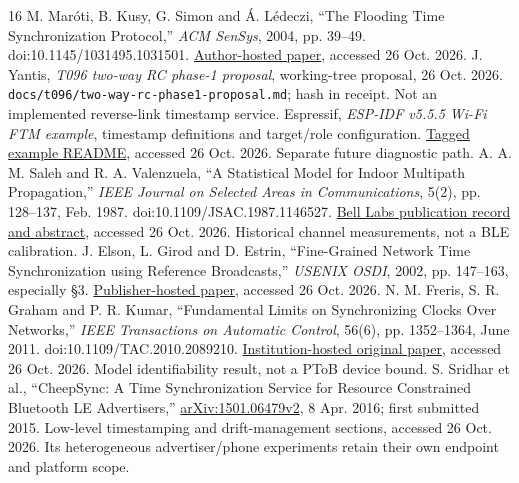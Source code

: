 \documentclass[11pt,letterpaper]{article}
\newcommand{\src}[1]{\nolinkurl{#1}}
\begin{document}
\begin{thebibliography}{16}
 M. Mar\'oti, B. Kusy, G. Simon and \'A. L\'edeczi, ``The Flooding Time Synchronization Protocol,'' \textit{ACM SenSys}, 2004, pp. 39--49. doi:10.1145/1031495.1031501. \href{https://www.isis.vanderbilt.edu/sites/isis.vanderbilt.edu/files/bibcite_files/Maroti_M_11_3_2004_The_Floodi_0.pdf}{Author-hosted paper}, accessed 26 Oct. 2026.
 J. Yantis, \textit{T096 two-way RC phase-1 proposal}, working-tree proposal, 26 Oct. 2026. \src{docs/t096/two-way-rc-phase1-proposal.md}; hash in receipt. Not an implemented reverse-link timestamp service.
 Espressif, \textit{ESP-IDF v5.5.5 Wi-Fi FTM example}, timestamp definitions and target/role configuration. \href{https://raw.githubusercontent.com/espressif/esp-idf/v5.5.5/examples/wifi/ftm/README.md}{Tagged example README}, accessed 26 Oct. 2026. Separate future diagnostic path.
 A. A. M. Saleh and R. A. Valenzuela, ``A Statistical Model for Indoor Multipath Propagation,'' \textit{IEEE Journal on Selected Areas in Communications}, 5(2), pp. 128--137, Feb. 1987. doi:10.1109/JSAC.1987.1146527. \href{https://www.nokia.com/bell-labs/publications-and-media/publications/a-statistical-model-for-indoor-multipath-propagation/}{Bell Labs publication record and abstract}, accessed 26 Oct. 2026. Historical channel measurements, not a BLE calibration.
 J. Elson, L. Girod and D. Estrin, ``Fine-Grained Network Time Synchronization using Reference Broadcasts,'' \textit{USENIX OSDI}, 2002, pp. 147--163, especially \S3. \href{https://www.usenix.org/legacy/events/osdi02/tech/full_papers/elson/elson.pdf}{Publisher-hosted paper}, accessed 26 Oct. 2026.
 N. M. Freris, S. R. Graham and P. R. Kumar, ``Fundamental Limits on Synchronizing Clocks Over Networks,'' \textit{IEEE Transactions on Automatic Control}, 56(6), pp. 1352--1364, June 2011. doi:10.1109/TAC.2010.2089210. \href{https://cs.nyu.edu/~apanda/classes/sp25/papers/time-sync-limits.pdf}{Institution-hosted original paper}, accessed 26 Oct. 2026. Model identifiability result, not a PToB device bound.
 S. Sridhar et al., ``CheepSync: A Time Synchronization Service for Resource Constrained Bluetooth LE Advertisers,'' \href{https://arxiv.org/html/1501.06479v2}{arXiv:1501.06479v2}, 8 Apr. 2016; first submitted 2015. Low-level timestamping and drift-management sections, accessed 26 Oct. 2026. Its heterogeneous advertiser/phone experiments retain their own endpoint and platform scope.
\end{thebibliography}
\end{document}
